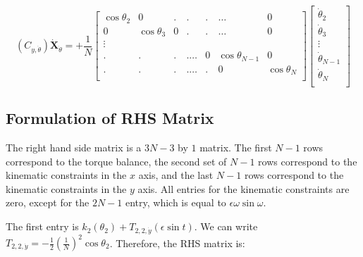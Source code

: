 \documentclass[12pt,letterpaper,titlepage]{article}
\begin{document}
\[
(C_{y,\dot{\theta}}) \mathbf{\dot{X}}_{\dot{\theta}} = + \frac{1}{N} \begin{bmatrix}
\cos\theta_2&0&.&.&.& \hdots &0\\
0&\cos\theta_3&0&.&.& \hdots &0\\
\vdots \\
.&.&.&.\hdots &0&\cos\theta_{N-1}&0\\
.&.&.&.\hdots &.&0&\cos\theta_N\\
\end{bmatrix}
\begin{bmatrix}
\dot{\theta}_2\\
\dot{\theta}_3\\
\vdots\\
\dot{\theta}_{N-1}\\
\dot{\theta}_N\\
\end{bmatrix}
\]

\newpage

\subsection{Formulation of RHS Matrix}
The right hand side matrix is a $3N - 3$ by $1$ matrix. The first $N - 1$ rows correspond to the torque balance, the second set of $N - 1$ rows correspond to the kinematic constraints in the $x$ axis, and the last $N - 1$ rows correspond to the kinematic constraints in the $y$ axis. All entries for the kinematic constraints are zero, except for the $2N - 1$ entry, which is equal to $\epsilon \omega \sin \omega$.

The first entry is $k_2 (\theta_2) + T_{2,2,\dot{y}}(\epsilon \sin t)$. We can write $T_{2,2,\dot{y}} = -\frac{1}{2}(\frac{1}{N})^2 \cos \theta_2$. Therefore, the RHS matrix is:
\end{document}
